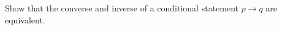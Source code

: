 \guard





\begin{exercise}
\label{exercise:converseEquivalentInverse}
  Show that the converse and inverse of a conditional statement $p\rightarrow q$ are equivalent.
\end{exercise}
